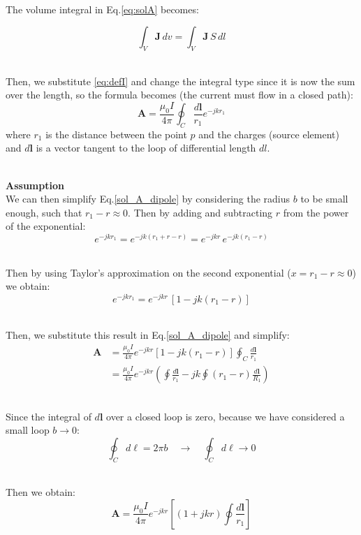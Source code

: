\documentclass[main]{subfiles}
\begin{document}
\noindent\\
The volume integral in Eq.\ref{eq:solA} becomes:

\[
    \int_V \mathbf{J} \, dv =  \int_V \mathbf{J} \, S \, dl
\]

\noindent\\
Then, we substitute \ref{eq:defI} and change the 
integral type since it is now the sum over the length, 
so the formula becomes (the current must flow in a 
closed path):
\begin{equation}
 \mathbf{A} = \frac{\mu_0 I}{4\pi} \oint_C 
 \frac{d\mathbf{l}}{r_1} e^{-j k r_1}
    \label{sol_A_dipole}
\end{equation}
where $r_1$ is the distance between the point $p$ and 
the charges (source element) and $d\mathbf{l}$ is a 
vector tangent to the loop of differential length $dl$.

\noindent\\
\textbf{Assumption} \label{Assumption}\noindent\\
We can then simplify Eq.\ref{sol_A_dipole} by considering 
the radius $b$ to be small enough, such that 
$r_1 - r \approx 0$. Then by adding and subtracting $r$ 
from the power of the exponential:
\[
 e^{-j k r_1} = e^{-j k (r_1 + r - r)} = 
 e^{-j k r} \, e^{-j k (r_1 - r)}
\]

\noindent\\
Then by using Taylor's approximation on the second 
exponential ($ x = r_1 - r \approx 0$) we obtain:
\[
 e^{-j k r_1} = e^{-j k r}\, \left[ 1 - j k (r_1 - r) \right]
\]

\noindent\\
Then, we substitute this result in Eq.\ref{sol_A_dipole} 
and simplify:
\[
\begin{aligned}
 \mathbf{A} &= \frac{\mu_0 I}{4 \pi} e^{-j k r} 
 \left[ 1 - j k (r_1 - r) \right] \oint_C 
 \frac{d\mathbf{l}}{r_1} \\
    &= \frac{\mu_0 I}{4 \pi} e^{-j k r} \left( 
    \oint \frac{d\mathbf{l}}{r_1} - j k \oint 
 (r_1 - r) \frac{d\mathbf{l}}{R_1} \right)
\end{aligned}
\]

\noindent\\
Since the integral of \(d\mathbf{l}\) over a closed loop 
is zero, because we have considered a small loop $b \to 0$:
\[
    \oint_C d\ell = 2\pi b \quad \rightarrow \quad 
    \oint_C d\ell \rightarrow 0
\]

\noindent\\
Then we obtain:
\begin{equation}
 \mathbf{A} = \frac{\mu_0 I}{4 \pi} e^{-j k r} 
 \left[ \left(1 + j k r \right) \oint 
 \frac{d\mathbf{l}}{r_1}\right]
    \label{eq:sol_A_simp}
\end{equation}
\end{document}
